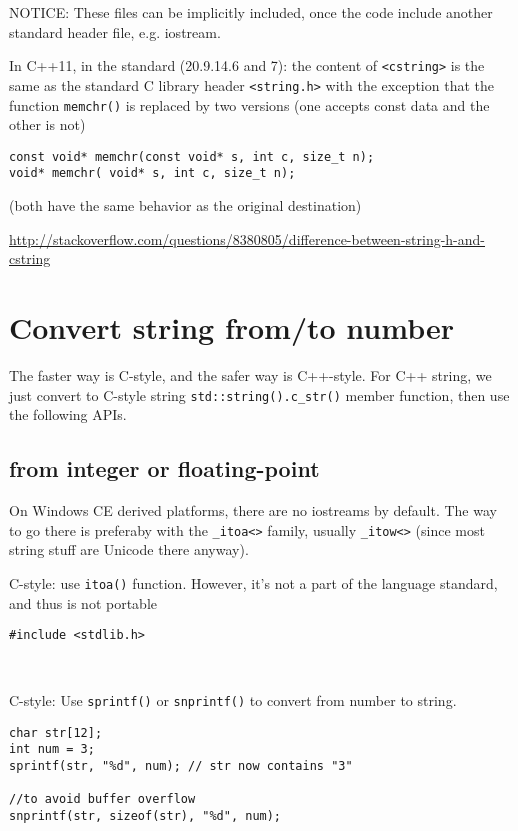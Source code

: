 NOTICE: These files can be implicitly included, once the code include another
standard header file, e.g. iostream.

In C++11, in the standard (20.9.14.6 and 7):
the content of \verb!<cstring>! is the same as the standard C library header
\verb!<string.h>! with the exception that the function \verb!memchr()! is
replaced by two versions (one accepts const data and the other is not)
\begin{verbatim}
const void* memchr(const void* s, int c, size_t n);
void* memchr( void* s, int c, size_t n);
\end{verbatim}
(both have the same behavior as the original destination)

\url{http://stackoverflow.com/questions/8380805/difference-between-string-h-and-cstring}

\section{Convert string from/to number}

The faster way is C-style, and the safer way is C++-style. For C++ string, we
just convert to C-style string \verb!std::string().c_str()! member function,
then use the following APIs.

\subsection{from integer or floating-point}

\begin{framed}
On Windows CE derived platforms, there are no iostreams by default. The way to
go there is preferaby with the \verb!_itoa<>! family, usually \verb!_itow<>!
(since most string stuff are Unicode there anyway).
\end{framed}

C-style: use \verb!itoa()! function. However, it's not a part of the
language standard, and thus is not portable
\begin{verbatim}
#include <stdlib.h>

	
\end{verbatim}
C-style: Use \verb!sprintf()! or \verb!snprintf()! to convert from number to
string.
\begin{verbatim}
char str[12];
int num = 3;
sprintf(str, "%d", num); // str now contains "3"

//to avoid buffer overflow
snprintf(str, sizeof(str), "%d", num);
\end{verbatim}

